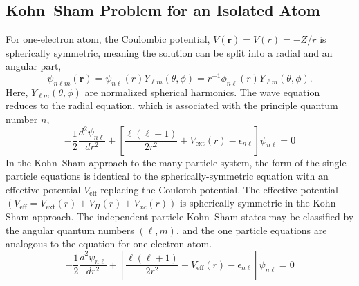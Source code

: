 \subsection{Kohn--Sham Problem for an Isolated Atom}
For one-electron atom, the Coulombic potential, $V(\mathbf{r}) = V(r) = -Z/r$ is spherically symmetric, meaning the solution can be split into a radial and an angular part, 
\begin{equation}
\label{eq_rad_ang}
\psi_{n\ell m} (\mathbf{r}) = \psi_{n\ell}(r) Y_{\ell m}(\theta,\phi) = r^{-1} \phi_{n\ell}(r) Y_{\ell m} (\theta,\phi).
\end{equation}
Here, $Y_{\ell m}(\theta, \phi)$ are normalized spherical harmonics. The wave equation reduces to the radial equation, which is associated with the principle quantum number $n$,
\begin{equation}
\label{eq_radial}
-\frac{1}{2}\frac{d^2 \psi_{n\ell}}{dr^2}  + \left [ \frac{\ell(\ell+1)}{2r^2} + V_{\text{ext}}(r) - \epsilon_{n\ell} \right ] \psi_{n\ell} = 0
\end{equation}
In the Kohn--Sham approach to the many-particle system, the form of the single-particle equations is identical to the spherically-symmetric \schrod equation with an effective potential $V_{\text{eff}}$ replacing the Coulomb potential. The effective potential $(V_{\text{eff}} = V_{\text{ext}}(r) + V_{H} (r) + V_{xc} (r))$ is spherically symmetric in the Kohn--Sham approach. The independent-particle Kohn--Sham states may be classified by the angular quantum numbers $(\ell, m)$, and the one particle equations are analogous to the \schrod equation for one-electron atom. 
\begin{equation}
\label{eq_oneparticle}
-\frac{1}{2}\frac{d^2 \psi_{n\ell}}{dr^2}  + \left [ \frac{\ell(\ell+1)}{2r^2} + V_{\text{eff}}(r) - \epsilon_{n\ell} \right ] \psi_{n\ell} = 0
\end{equation}

